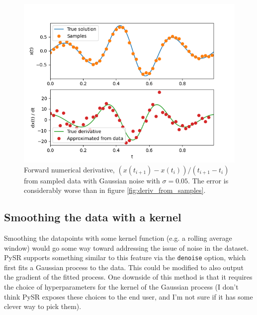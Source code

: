 \documentclass{article}
\begin{document}
\begin{figure}
\includegraphics{images/alternative_methods/deriv_from_noisy_samples.png}
\centering
\caption{Forward numerical derivative, $\left(x(t_{i+1}) - x(t_i)\right)/\left(t_{i+1} - t_i\right)$ from sampled data with Gaussian noise with $\sigma = 0.05$. The error is considerably worse than in figure \ref{fig:deriv_from_samples}.}
\label{fig:deriv_from_noisy_samples}
\end{figure}

\subsection{Smoothing the data with a kernel}
\label{sec:smoothing}

Smoothing the datapoints with some kernel function (e.g. a rolling average window) would go some way toward addressing the issue of noise in the dataset.
PySR supports something similar to this feature via the \texttt{denoise} option, which first fits a Gaussian process to the data.
This could be modified to also output the gradient of the fitted process.
One downside of this method is that it requires the choice of hyperparameters for the kernel of the Gaussian process (I don't think PySR exposes these choices to the end user, and I'm not sure if it has some clever way to pick them).
\end{document}
